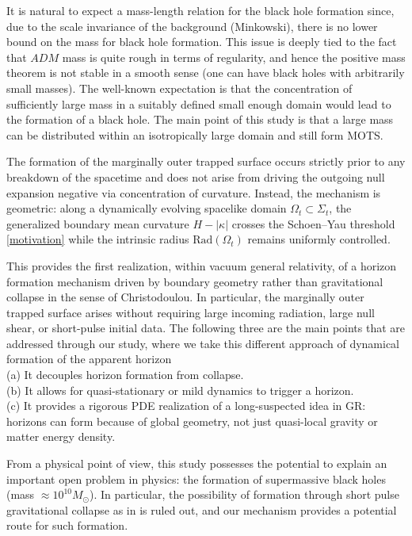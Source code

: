 \documentclass{amsart}
\begin{document}
\noindent It is natural to expect a mass-length relation for the black hole formation since, due to the scale invariance of the background (Minkowski), there is no lower bound on the mass for black hole formation. This issue is deeply tied to the fact that $ADM$ mass is quite rough in terms of regularity, and hence the positive mass theorem is not stable in a smooth sense (one can have black holes with arbitrarily small masses). The well-known expectation is that the concentration of sufficiently large mass in a suitably defined small enough domain would lead to the formation of a black hole. The main point of this study is that a large mass can be distributed within an isotropically large domain and still form MOTS.

\noindent The formation of the marginally outer trapped surface occurs strictly prior to any breakdown of the spacetime and does not arise from driving the outgoing null expansion negative via concentration of curvature. Instead, the mechanism is geometric: along a dynamically evolving spacelike domain $\Omega_t\subset\Sigma_t$, the generalized boundary mean curvature $H-|\kappa|$ crosses the Schoen--Yau threshold \eqref{motivation} while the intrinsic radius $\text{Rad}(\Omega_t)$ remains uniformly controlled.

\noindent This provides the first realization, within vacuum general relativity, of a horizon formation mechanism driven by boundary geometry rather than gravitational collapse in the sense of Christodoulou. In particular, the marginally outer trapped surface arises without requiring large incoming radiation, large null shear, or short-pulse initial data. The following three are the main points that are addressed through our study, where we take this different approach of dynamical formation of the apparent horizon \\ 
(a) It decouples horizon formation from collapse.\\
(b) It allows for quasi-stationary or mild dynamics to trigger a horizon.\\
(c) It provides a rigorous PDE realization of a long-suspected idea in GR:
horizons can form because of global geometry, not just quasi-local gravity or matter energy density.

\noindent From a physical point of view, this study possesses the potential to explain an important open problem in physics: the formation of supermassive black holes (mass $\approx 10^{10}M_{\odot}$). In particular, the possibility of formation through short pulse gravitational collapse as in \cite{christodoulou} is ruled out, and our mechanism provides a potential route for such formation.  
\end{document}

